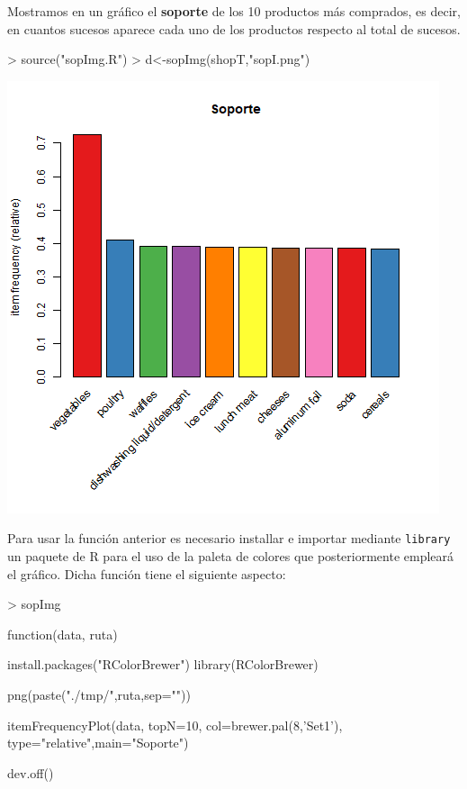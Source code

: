 \documentclass [a4paper] {article}
\begin{document}
{Mostramos en un gráfico el \textbf{soporte} de los 10 productos más comprados, es decir, en cuantos
sucesos aparece cada uno de los productos respecto al total de sucesos.
\begin{Schunk}
\begin{Sinput}
> source("sopImg.R")
> d<-sopImg(shopT,"sopI.png")
\end{Sinput}
\end{Schunk}
\includegraphics[width=\textwidth]{sopI}

Para usar la función anterior es necesario installar e importar mediante \texttt{library} un paquete de R
para el uso de la paleta de colores que posteriormente empleará el gráfico. Dicha función tiene el siguiente
aspecto:
\begin{Schunk}
\begin{Sinput}
> sopImg
\end{Sinput}
\begin{Soutput}
function(data, ruta) {

    install.packages("RColorBrewer")
    library(RColorBrewer)

    png(paste("./tmp/",ruta,sep=""))

    itemFrequencyPlot(data, topN=10, col=brewer.pal(8,'Set1'),
        type="relative",main="Soporte")

    dev.off()
}
\end{Soutput}
\end{Schunk}

}
\end{document}
